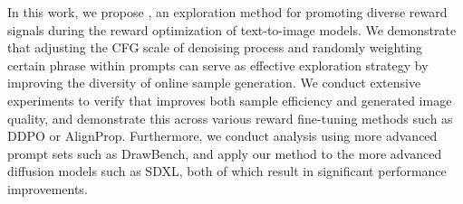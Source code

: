 In this work, we propose \metabbr, an exploration method for promoting diverse reward signals during the reward optimization of text-to-image models. We demonstrate that adjusting the CFG scale of denoising process and randomly weighting certain phrase within prompts can serve as effective exploration strategy by improving the diversity of online sample generation. 
We conduct extensive experiments to verify that \metabbr improves both sample efficiency and generated image quality, and demonstrate this across various reward fine-tuning methods such as DDPO or AlignProp.
Furthermore, we conduct analysis using more advanced prompt sets such as DrawBench, and apply our method to the more advanced diffusion models such as SDXL, both of which result in significant performance improvements.